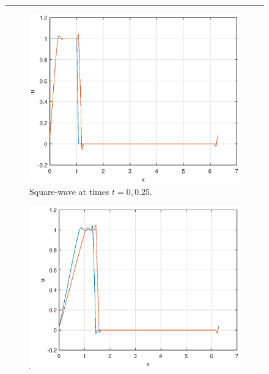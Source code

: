 \documentclass[a4paper, 12pt]{article}
\begin{document}
\begin{figure}[H]
\begin{center}
\rule{\linewidth}{.4pt}
\end{center}
\begin{subfigure}[b]{0.5\textwidth}
\includegraphics[width=\textwidth]{Q3square_t=025}\hfill
\caption{Square-wave at times $t=0,0.25$.}%
\end{subfigure}
\begin{subfigure}[b]{0.5\textwidth}
\includegraphics[width=\textwidth]{Q3square_t=1}\hfill

\end{subfigure}
\end{figure}
\end{document}
